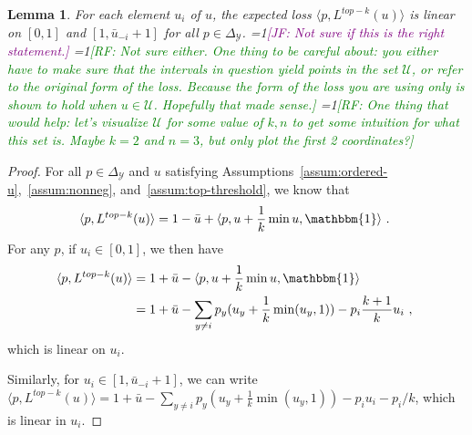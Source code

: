 \documentclass[12pt]{article}
\newcommand{\Comments}{1}
\newcommand{\mynote}[2]{\ifnum\Comments=1\textcolor{#1}{#2}\fi}
\newcommand{\raf}[1]{\mynote{green}{[RF: #1]}}
\newcommand{\jessie}[1]{\mynote{purple}{[JF: #1]}}
\newcommand{\simplex}{\Delta_\Y}
\newcommand{\U}{\mathcal{U}}
\newcommand{\Y}{\mathcal{Y}}
\newcommand{\inprod}[2]{\langle #1, #2 \rangle}%
\newcommand{\ones}{\mathbbm{1}}
\newtheorem{lemma}{Lemma}
\begin{document}
\begin{lemma}\label{lem:linear-pieces}
	For each element $u_i$ of $u$, the expected loss $\inprod{p}{L^{top-k}(u)}$ is linear on $[0,1]$ and $[1, \bar u_{-i} + 1]$ for all $p \in \simplex$.
	\jessie{Not sure if this is the right statement.}
    \raf{Not sure either.  One thing to be careful about: you either have to make sure that the intervals in question yield points in the set $\U$, or refer to the original form of the loss.  Because the form of the loss you are using only is shown to hold when $u\in\U$.  Hopefully that made sense.}
    \raf{One thing that would help: let's visualize $\U$ for some value of $k,n$ to get some intuition for what this set is.  Maybe $k=2$ and $n=3$, but only plot the first 2 coordinates?}
\end{lemma}
\begin{proof}
	For all $p \in \simplex$ and $u$ satisfying Assumptions~\ref{assum:ordered-u},~\ref{assum:nonneg}, and~\ref{assum:top-threshold}, we know that 
	\begin{equation}
	\inprod{p}{L^{top-k}(u)} = 1 - \bar u + \inprod{p}{u + \frac 1 k \min{u,\ones}}~.~
	\end{equation}
	For any $p$, if $u_i \in [0,1]$, we then have 
	\begin{align*}
	\inprod{p}{L^{top-k}(u)} &= 1 + \bar u - \inprod{p}{u + \frac 1 k \min{u,\ones}}\\
	 &= 1 + \bar u - \sum_{y \neq i}p_y (u_y + \frac 1 k \min(u_y, 1)) - p_i \frac {k+1} k u_i~,~
	\end{align*}
	which is linear on $u_i$.
	
	Similarly, for $u_i \in [1, \bar u_{-i} + 1]$, we can write $\inprod{p}{L^{top-k}(u)} = 1 + \bar u - \sum_{y \neq i}p_y (u_y + \frac 1 k \min(u_y, 1)) - p_i u_i - p_i/k$, which is linear in $u_i$.
\end{proof}
\end{document}
